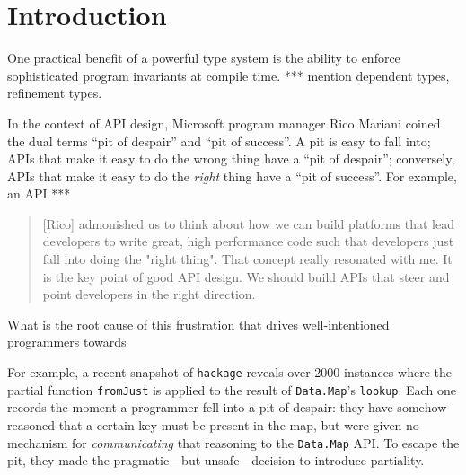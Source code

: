 \documentclass[format=sigplan, review=false, screen=true]{acmart}
\begin{document}
\renewcommand{\shortauthors}{M. Noonan}

%

\section{Introduction}

One practical benefit of a powerful type
system is the ability to enforce sophisticated program
invariants at compile time. *** mention dependent types,
refinement types.

In the context of API design, Microsoft program manager
Rico Mariani coined the dual terms ``pit of despair'' and
``pit of success''. A pit is easy to fall into; APIs that
make it easy to do the wrong thing have a ``pit of despair'';
conversely, APIs that make it easy to do the \emph{right} thing
have a ``pit of success''. For example, an API ***

\begin{quote}
  [Rico] admonished us to think about how we can build platforms that lead developers to write great, high performance code such that developers just fall into doing the "right thing". That concept really resonated with me. It is the key point of good API design. We should build APIs that steer and point developers in the right direction.
\end{quote}

What is the root cause of this frustration that drives
well-intentioned programmers towards 


For example, a recent snapshot of \texttt{hackage}
reveals over 2000 instances where the partial function
\texttt{fromJust} is applied to the
result of \texttt{Data.Map}'s \texttt{lookup}. Each one
records the moment a programmer fell into a pit of despair:
they have somehow reasoned that a certain key must be
present in the map, but were given no mechanism for
\emph{communicating} that reasoning to the
\texttt{Data.Map} API. To escape the pit, they made the
pragmatic---but unsafe---decision to introduce partiality.
\end{document}
